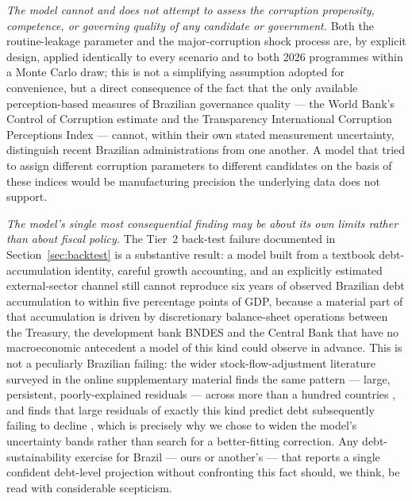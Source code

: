 \documentclass[11pt,a4paper]{article}
\begin{document}
\emph{The model cannot and does not attempt to assess the corruption propensity, competence, or governing quality of any candidate or government.} Both the routine-leakage parameter and the major-corruption shock process are, by explicit design, applied identically to every scenario and to both 2026 programmes within a Monte Carlo draw; this is not a simplifying assumption adopted for convenience, but a direct consequence of the fact that the only available perception-based measures of Brazilian governance quality --- the World Bank's Control of Corruption estimate and the Transparency International Corruption Perceptions Index --- cannot, within their own stated measurement uncertainty, distinguish recent Brazilian administrations from one another. A model that tried to assign different corruption parameters to different candidates on the basis of these indices would be manufacturing precision the underlying data does not support.

\emph{The model's single most consequential finding may be about its own limits rather than about fiscal policy.} The Tier~2 back-test failure documented in Section~\ref{sec:backtest} is a substantive result: a model built from a textbook debt-accumulation identity, careful growth accounting, and an explicitly estimated external-sector channel still cannot reproduce six years of observed Brazilian debt accumulation to within five percentage points of GDP, because a material part of that accumulation is driven by discretionary balance-sheet operations between the Treasury, the development bank BNDES and the Central Bank that have no macroeconomic antecedent a model of this kind could observe in advance. This is not a peculiarly Brazilian failing: the wider stock-flow-adjustment literature surveyed in the online supplementary material finds the same pattern --- large, persistent, poorly-explained residuals --- across more than a hundred countries \citep{weber2012sfa}, and finds that large residuals of exactly this kind predict debt subsequently failing to decline \citep{jaramilloetal2017}, which is precisely why we chose to widen the model's uncertainty bands rather than search for a better-fitting correction. Any debt-sustainability exercise for Brazil --- ours or another's --- that reports a single confident debt-level projection without confronting this fact should, we think, be read with considerable scepticism.
\end{document}
